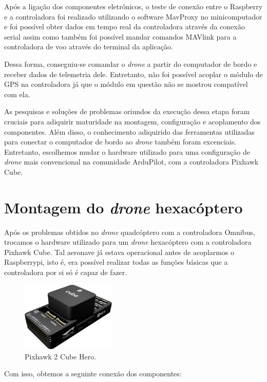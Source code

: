 \documentclass[12pt,a4paper,oneside]{book}
\begin{document}
Após a ligação dos componentes eletrônicos, o teste de conexão entre o Raspberry e a controladora foi realizado utilizando o software MavProxy no minicomputador e foi possível obter dados em tempo real da controladora através da conexão serial assim como também foi possível mandar comandos MAVlink para a controladora de voo através do terminal da aplicação.

Dessa forma, conseguiu-se comandar o \textit{drone} a partir do computador de bordo e receber dados de telemetria dele. Entretanto, não foi possível acoplar o módulo de GPS na controladora já que o módulo em questão não se mostrou compatível com ela.

As pesquisas e soluções de problemas oriundos da execução dessa etapa foram cruciais para adiquirir maturidade na montagem, configuração e acoplamento dos componentes. Além disso, o conhecimento adiquirido das ferramentas utilizadas para conectar o computador de bordo ao \textit{drone} também foram excenciais. Entretanto, escolhemos mudar o hardware utilizado para uma configuração de \textit{drone} mais convencional na comunidade ArduPilot, com a controladora Pixhawk Cube. 

\section{Montagem do \textit{drone} hexacóptero}

Após os problemas obtidos no \textit{drone} quadcóptero com a controladora Omnibus, trocamos o hardware utilizado para um \textit{drone} hexacóptero com a controladora Pixhawk Cube. Tal aeronave já estava operacional antes de acoplarmos o Raspberrypi, isto é, era possível realizar todas as funções básicas que a controladora por si só é capaz de fazer.
%
\begin{figure}[!htbp]
  \centering
  \includegraphics[width=0.4\textwidth]{Images/Desenvolvimento/pixhawk2_cube_hero.png}
  \caption{Pixhawk 2 Cube Hero.}
  \label{fig:pixhawk2_cube_hero.png.0}
\end{figure}
%

Com isso, obtemos a seguinte conexão dos componentes:
\end{document}
